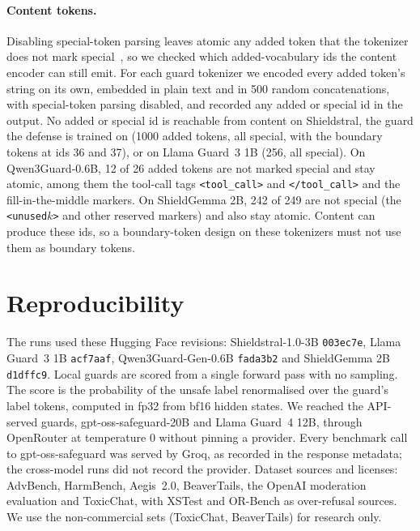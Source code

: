 \paragraph{Content tokens.}
Disabling special-token parsing leaves atomic any added token that the tokenizer does not mark special~\citep{zhan2026samebytes,yang2026nameless}, so we checked which added-vocabulary ids the content encoder can still emit.
For each guard tokenizer we encoded every added token's string on its own, embedded in plain text and in 500 random concatenations, with special-token parsing disabled, and recorded any added or special id in the output. %
No added or special id is reachable from content on Shieldstral, the guard the defense is trained on (1000 added tokens, all special, with the boundary tokens at ids 36 and 37), or on Llama Guard~3 1B (256, all special).
On Qwen3Guard-0.6B, 12 of 26 added tokens are not marked special and stay atomic, among them the tool-call tags \texttt{<tool\_call>} and \texttt{</tool\_call>} and the fill-in-the-middle markers. On ShieldGemma 2B, 242 of 249 are not special (the \texttt{<unused$k$>} and other reserved markers) and also stay atomic.
Content can produce these ids, so a boundary-token design on these tokenizers must not use them as boundary tokens.

\section{Reproducibility}
\label{app:repro}

The runs used these Hugging Face revisions: Shieldstral-1.0-3B \texttt{003ec7e}, Llama Guard~3 1B \texttt{acf7aaf}, Qwen3Guard-Gen-0.6B \texttt{fada3b2} and ShieldGemma 2B \texttt{d1dffc9}. Local guards are scored from a single forward pass with no sampling. The score is the probability of the unsafe label renormalised over the guard's label tokens, computed in fp32 from bf16 hidden states. We reached the API-served guards, gpt-oss-safeguard-20B and Llama Guard~4 12B, through OpenRouter at temperature 0 without pinning a provider. Every benchmark call to gpt-oss-safeguard was served by Groq, as recorded in the response metadata; the cross-model runs did not record the provider. %
Dataset sources and licenses: AdvBench, HarmBench, Aegis~2.0, BeaverTails, the OpenAI moderation evaluation and ToxicChat, with XSTest and OR-Bench as over-refusal sources. We use the non-commercial sets (ToxicChat, BeaverTails) for research only. %

